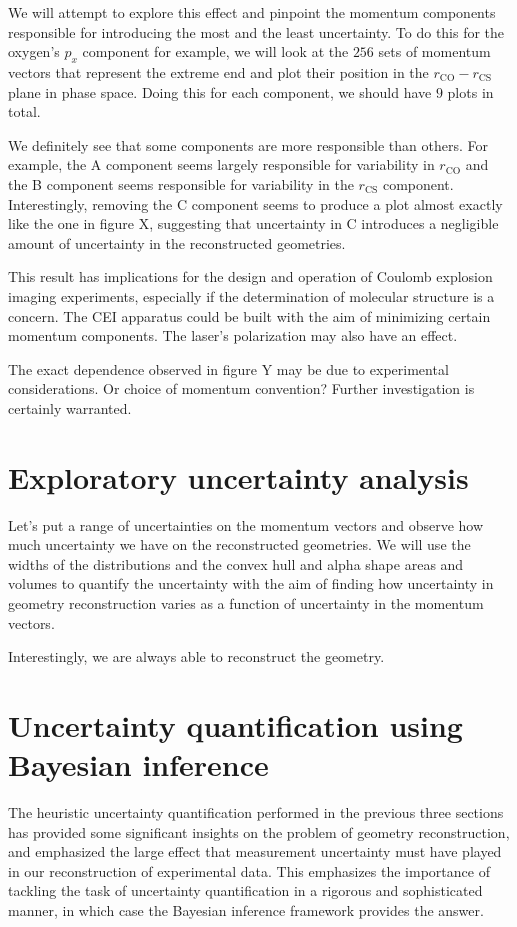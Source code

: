 We will attempt to explore this effect and pinpoint the momentum components responsible for introducing the most and the least uncertainty. To do this for the oxygen's $p_x$ component for example, we will look at the $256$ sets of momentum vectors that represent the extreme end and plot their position in the $r_\mathrm{CO}-r_\mathrm{CS}$ plane in phase space. Doing this for each component, we should have $9$ plots in total.


We definitely see that some components are more responsible than others. For example, the A component seems largely responsible for variability in $r_\mathrm{CO}$ and the B component seems responsible for variability in the $r_\mathrm{CS}$ component. Interestingly, removing the C component seems to produce a plot almost exactly like the one in figure X, suggesting that uncertainty in C introduces a negligible amount of uncertainty in the reconstructed geometries.

This result has implications for the design and operation of Coulomb explosion imaging experiments, especially if the determination of molecular structure is a concern. The CEI apparatus could be built with the aim of minimizing certain momentum components. The laser's polarization may also have an effect.

The exact dependence observed in figure Y may be due to experimental considerations. Or choice of momentum convention? Further investigation is certainly warranted.

\section{Exploratory uncertainty analysis} \label{sec:uncertaintyAnalysis}
Let's put a range of uncertainties on the momentum vectors and observe how much uncertainty we have on the reconstructed geometries. We will use the widths of the distributions and the convex hull and alpha shape areas and volumes to quantify the uncertainty with the aim of finding how uncertainty in geometry reconstruction varies as a function of uncertainty in the momentum vectors.


Interestingly, we are always able to reconstruct the geometry.

\section{Uncertainty quantification using Bayesian inference} \label{sec:uncertaintyBayesian}
The heuristic uncertainty quantification performed in the previous three sections has provided some significant insights on the problem of geometry reconstruction, and emphasized the large effect that measurement uncertainty must have played in our reconstruction of experimental data. This emphasizes the importance of tackling the task of uncertainty quantification in a rigorous and sophisticated manner, in which case the Bayesian inference framework provides the answer.

